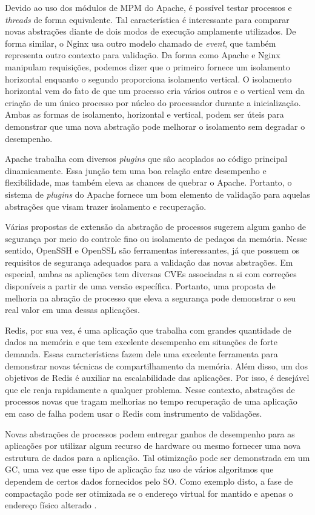 Devido ao uso dos módulos de MPM do Apache, é possível testar processos e
\emph{threads} de forma equivalente.  Tal característica é interessante para
comparar novas abstrações diante de dois modos de execução amplamente
utilizados. De forma similar, o Nginx usa outro modelo chamado de \emph{event},
que também representa outro contexto para validação. Da forma como Apache e
Nginx manipulam requisições, podemos dizer que o primeiro fornece um isolamento
horizontal enquanto o segundo proporciona isolamento vertical. O isolamento
horizontal vem do fato de que um processo cria vários outros e o vertical vem
da criação de um único processo por núcleo do processador durante a
inicialização. Ambas as formas de isolamento, horizontal e vertical,  podem ser
úteis para demonstrar que uma nova abstração pode melhorar o isolamento sem
degradar o desempenho.

Apache trabalha com diversos \emph{plugins} que são acoplados ao código
principal dinamicamente. Essa junção tem uma boa relação entre desempenho e
flexibilidade, mas também eleva as chances de quebrar o Apache.  Portanto, o
sistema de \emph{plugins} do Apache fornece um bom elemento de validação para
aquelas abstrações que visam trazer isolamento e recuperação.

Várias propostas de extensão da abstração de processos sugerem algum ganho de
segurança por meio do controle fino ou isolamento de pedaços da memória. Nesse
sentido, OpenSSH e OpenSSL são ferramentas interessantes, já que possuem os
requisitos de segurança adequados para a validação das novas abstrações. Em
especial, ambas as aplicações tem diversas CVEs associadas a si com correções
disponíveis a partir de uma versão específica. Portanto, uma proposta de
melhoria na abração de processo que eleva a segurança pode demonstrar o seu
real valor em uma dessas aplicações.

Redis, por sua vez, é uma aplicação que trabalha com grandes quantidade de
dados na memória e que tem excelente desempenho em situações de forte
demanda. Essas características fazem dele uma excelente ferramenta para
demonstrar novas técnicas de compartilhamento da memória. Além disso, um dos
objetivos de Redis é auxiliar na escalabilidade das aplicações. Por isso, é
desejável que ele reaja rapidamente a qualquer problema. Nesse contexto,
abstrações de processos novas que tragam melhorias no tempo recuperação de uma
aplicação em caso de falha podem usar o Redis com instrumento de validações.

Novas abstrações de processos podem entregar ganhos de desempenho para as
aplicações por utilizar algum recurso de hardware ou mesmo fornecer uma nova
estrutura de dados para a aplicação. Tal otimização pode ser demonstrada em um
GC, uma vez que esse tipo de aplicação faz uso de vários algoritmos que dependem
de certos dados fornecidos pelo SO. Como exemplo disto, a fase de compactação
pode ser otimizada se o endereço virtual for mantido e apenas o endereço físico
alterado \citep{pauseless}.

